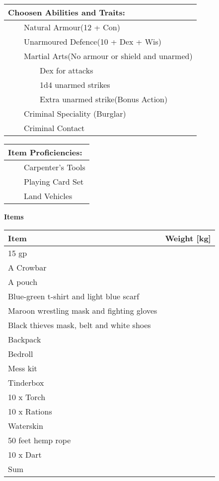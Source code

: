 \documentclass[11pt]{article}
\newcommand{\tabitem}{~~\llap{--}~~}
\newcommand{\tabtabitem}{~~~~~~\llap{$\bullet$}~~}
\begin{document}
\begin{multicols}{2}
\vspace{4mm}

\noindent \begin{tabularx}{95mm}{@{}l}
{\Large \textbf{Choosen Abilities and Traits:}} \\
\hline
\tabitem Natural Armour(12 + Con) \\
\tabitem Unarmoured Defence(10 + Dex + Wis) \\
\tabitem Martial Arts(No armour or shield and unarmed) \\
\tabtabitem Dex for attacks \\
\tabtabitem 1d4 unarmed strikes \\
\tabtabitem Extra unarmed strike(Bonus Action) \\
\tabitem Criminal Speciality (Burglar) \\
\tabitem Criminal Contact
		\end{tabularx}

\vspace{4mm}

\noindent \begin{tabularx}{95mm}{@{}l}
{\Large \textbf{Item Proficiencies:}} \\
\hline
\tabitem Carpenter's Tools \\
\tabitem Playing Card Set \\
\tabitem Land Vehicles
		\end{tabularx}
	\end{multicols}

\clearpage

	\begin{center}
{\LARGE \textbf{Items}}
	\end{center}

	\begin{tabularx}{\textwidth}{X|r}
Item & Weight [kg] \\
\hline
15 gp 										& 			\\
A Crowbar									& 		 	\\
A pouch										& 			\\
Blue-green t-shirt and light blue scarf 	&			\\
Maroon wrestling mask and fighting gloves 	&			\\
Black thieves mask, belt and white shoes 	& 			\\
Backpack									&	 	 	\\
Bedroll										& 			\\
Mess kit								 	&			\\
Tinderbox								 	&			\\
10 x Torch								 	& 			\\
10 x Rations								&	 	 	\\
Waterskin									& 			\\
50 feet hemp rope						 	&			\\
10 x Dart								 	&			\\
\hline
Sum 										& 
	\end{tabularx}
\end{document}

